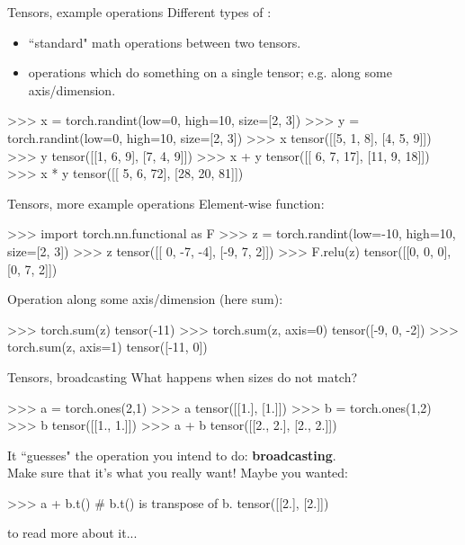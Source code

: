 \begin{frame}[fragile]{Tensors, example operations}
\vspace{-5mm}
Different types of : 
\begin{itemize}
\item ``standard" math operations between two tensors.
\item operations which do something on a single tensor; e.g. along some axis/dimension.
\end{itemize}
\begin{python}
>>> x = torch.randint(low=0, high=10, size=[2, 3])
>>> y = torch.randint(low=0, high=10, size=[2, 3])
>>> x
tensor([[5, 1, 8],
        [4, 5, 9]])
>>> y
tensor([[1, 6, 9],
        [7, 4, 9]])
>>> x + y
tensor([[ 6,  7, 17],
        [11,  9, 18]])
>>> x * y
tensor([[ 5,  6, 72],
        [28, 20, 81]])
\end{python}
\end{frame}

\begin{frame}[fragile]{Tensors, more example operations}
\vspace{-5mm}
Element-wise function:
\begin{python}
>>> import torch.nn.functional as F
>>> z = torch.randint(low=-10, high=10, size=[2, 3])
>>> z
tensor([[ 0, -7, -4],
        [-9,  7,  2]])
>>> F.relu(z)
tensor([[0, 0, 0],
        [0, 7, 2]])
\end{python}
\vsp
Operation along some axis/dimension (here sum):
\begin{python}
>>> torch.sum(z)
tensor(-11)
>>> torch.sum(z, axis=0)
tensor([-9,  0, -2])
>>> torch.sum(z, axis=1)
tensor([-11,   0])
\end{python}
\end{frame}

\begin{frame}[fragile]{Tensors, broadcasting}
\vspace{-7mm}
What happens when sizes do not match?
\pause
\begin{python}
>>> a = torch.ones(2,1)
>>> a
tensor([[1.],
        [1.]])
>>> b = torch.ones(1,2)
>>> b
tensor([[1., 1.]])
>>> a + b
tensor([[2., 2.],
        [2., 2.]])
\end{python}
It ``guesses" the operation you intend to do: \textbf{broadcasting}.\\ 
\pause
Make sure that it's what you really want! Maybe you wanted:
\begin{python}
>>> a + b.t()  # b.t() is transpose of b.
tensor([[2.],
        [2.]])
\end{python}  to read more about it...
\end{frame}

